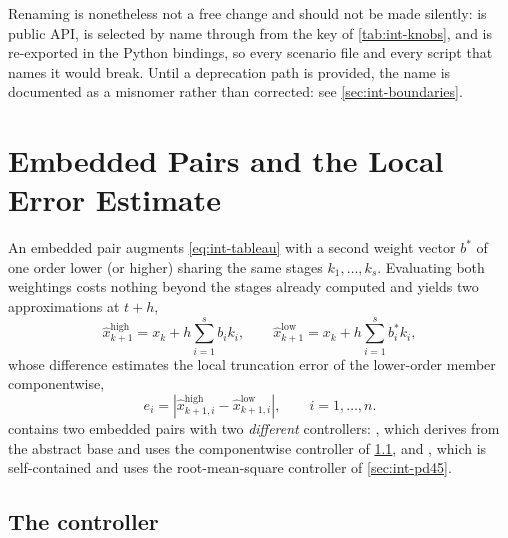 Renaming is nonetheless not a free change and should not be made silently:
 is public API, is selected by name through
 from the  key of \cref{tab:int-knobs},
and is re-exported in the Python bindings, so every scenario file and every
\pylupnt{} script that names it would break. Until a deprecation path is
provided, the name is documented as a misnomer rather than corrected: see
\cref{sec:int-boundaries}.

\section{Embedded Pairs and the Local Error Estimate}
\label{sec:int-embedded}

An embedded pair augments \cref{eq:int-tableau} with a second weight vector
$b^{*}$ of one order lower (or higher) sharing the same stages
$k_1,\dots,k_s$. Evaluating both weightings costs nothing beyond the stages
already computed and yields two approximations at $t+h$,
\begin{equation}
  \label{eq:int-pair}
  \hat{x}^{\mathrm{high}}_{k+1} = x_k + h\sum_{i=1}^{s} b_i k_i,
  \qquad
  \hat{x}^{\mathrm{low}}_{k+1}  = x_k + h\sum_{i=1}^{s} b^{*}_i k_i,
\end{equation}
whose difference estimates the local truncation error of the lower-order
member componentwise,
\begin{equation}
  \label{eq:int-err}
  e_i = \left| \hat{x}^{\mathrm{high}}_{k+1,i}
             - \hat{x}^{\mathrm{low}}_{k+1,i} \right|,
  \qquad i = 1,\dots,n .
\end{equation}
\lupnt{} contains two embedded pairs with two \emph{different} controllers:
, which derives from the abstract base  and uses the
componentwise controller of \cref{sec:int-control}, and , which is
self-contained and uses the root-mean-square controller of
\cref{sec:int-pd45}.

\subsection{The \texorpdfstring{}{IRKF} controller}
\label{sec:int-control}


